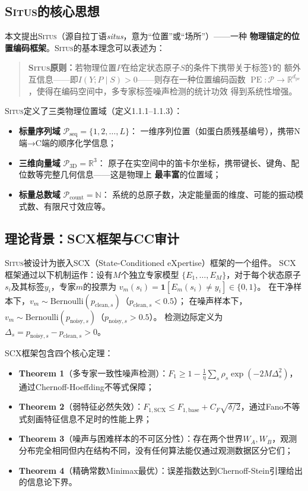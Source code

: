 \documentclass[11pt,a4paper]{article}
\theoremstyle{remark}
\DeclareMathOperator{\PE}{PE}
\newcommand{\R}{\mathbb{R}}
\newcommand{\N}{\mathbb{N}}
\newcommand{\Ppos}{\mathcal{P}}
\newcommand{\Situs}{\textsc{Situs}}
\newcommand{\pe}{\mathrm{pe}}
\begin{document}
\subsection{\Situs{}的核心思想}

本文提出\Situs{}（源自拉丁语\textit{situs}，意为``位置''或``场所''）——一种
\textbf{物理锚定的位置编码框架}。\Situs{}的基本理念可以表述为：

\begin{quote}
    \textbf{\Situs{}原则：}若物理位置$P$在给定状态原子$S$的条件下携带关于标签$Y$的
    额外互信息——即$I(Y; P \mid S) > 0$——则存在一种位置编码函数
    $\PE: \Ppos \to \R^{d_{\pe}}$，使得在编码空间中，多专家标签噪声检测的统计功效
    得到系统性增强。
\end{quote}

\Situs{}定义了三类物理位置域（定义1.1.1--1.1.3）：
\begin{itemize}
    \item \textbf{标量序列域} $\Ppos_{\text{seq}} = \{1, 2, \ldots, L\}$：
          一维序列位置（如蛋白质残基编号），携带N端→C端的顺序化学信息；
    \item \textbf{三维向量域} $\Ppos_{\text{3D}} = \R^3$：
          原子在实空间中的笛卡尔坐标，携带键长、键角、配位数等完整几何信息——这是物理上
          \textbf{最丰富}的位置域；
    \item \textbf{标量总数域} $\Ppos_{\text{count}} = \N$：
          系统的总原子数，决定能量面的维度、可能的振动模式数、有限尺寸效应等。
\end{itemize}

\subsection{理论背景：SCX框架与CC审计}

\Situs{}被设计为嵌入SCX（State-Conditioned eXpertise）框架的一个组件。
SCX框架通过以下机制运作\cite{scx2026theorems}：设有$M$个独立专家模型
$\{E_1, \ldots, E_M\}$，对于每个状态原子$s_i$及其标签$y_i$，专家$m$的投票为
$v_m(s_i) = \mathbf{1}[E_m(s_i) \neq y_i] \in \{0, 1\}$。
在干净样本下，$v_m \sim \text{Bernoulli}(p_{\text{clean}, s})$（$p_{\text{clean}, s} < 0.5$）；
在噪声样本下，$v_m \sim \text{Bernoulli}(p_{\text{noisy}, s})$（$p_{\text{noisy}, s} > 0.5$）。
检测边际定义为$\Delta_s = p_{\text{noisy}, s} - p_{\text{clean}, s} > 0$。

SCX框架包含四个核心定理\cite{scx2026cc_audit}：
\begin{itemize}
    \item \textbf{Theorem 1}（多专家一致性噪声检测）：$F_1 \geq 1 - \frac{1}{\eta}\sum_s \rho_s \exp(-2M\Delta_s^2)$，通过Chernoff-Hoeffding不等式保障；
    \item \textbf{Theorem 2}（弱特征必然失效）：$F_{1,\text{SCX}} \leq F_{1,\text{base}} + C_F\sqrt{\delta/2}$，通过Fano不等式刻画特征信息不足时的性能上界；
    \item \textbf{Theorem 3}（噪声与困难样本的不可区分性）：存在两个世界$W_A, W_B$，观测分布完全相同但内在结构不同，没有任何算法能仅通过观测数据区分它们；
    \item \textbf{Theorem 4}（精确常数Minimax最优）：误差指数达到Chernoff-Stein引理给出的信息论下界。
\end{itemize}
\end{document}
